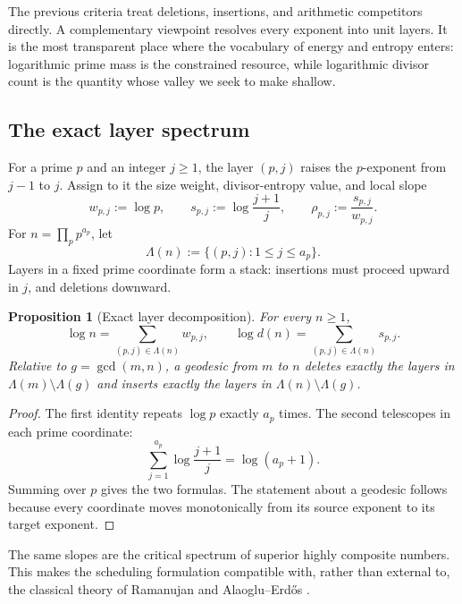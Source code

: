 \documentclass[11pt]{article}
\numberwithin{equation}{section}
\theoremstyle{blueplain}
\newtheorem{proposition}[theorem]{Proposition}
\theoremstyle{bluedef}
\begin{document}
The previous criteria treat deletions, insertions, and arithmetic competitors directly.  A complementary viewpoint resolves every exponent into unit layers.  It is the most transparent place where the vocabulary of energy and entropy enters: logarithmic prime mass is the constrained resource, while logarithmic divisor count is the quantity whose valley we seek to make shallow.

\subsection{The exact layer spectrum}

For a prime $p$ and an integer $j\ge1$, the layer $(p,j)$ raises the $p$-exponent from $j-1$ to $j$.  Assign to it the size weight, divisor-entropy value, and local slope
\begin{equation}
 w_{p,j}:=\log p,
 \qquad
 s_{p,j}:=\log\frac{j+1}{j},
 \qquad
 \rho_{p,j}:=\frac{s_{p,j}}{w_{p,j}}.
 \label{eq:layer-data}
\end{equation}
For $n=\prod_p p^{a_p}$, let
\begin{equation}
 \Lambda(n):=\{(p,j):1\le j\le a_p\}.
 \label{eq:layer-set}
\end{equation}
Layers in a fixed prime coordinate form a stack: insertions must proceed upward in $j$, and deletions downward.

\begin{proposition}[Exact layer decomposition]
\label{prop:layer-decomposition}
For every $n\ge1$,
\begin{equation}
 \boxed{
 \log n=\sum_{(p,j)\in\Lambda(n)}w_{p,j},
 \qquad
 \log d(n)=\sum_{(p,j)\in\Lambda(n)}s_{p,j}.}
 \label{eq:layer-decomposition}
\end{equation}
Relative to $g=\gcd(m,n)$, a geodesic from $m$ to $n$ deletes exactly the layers in $\Lambda(m)\setminus\Lambda(g)$ and inserts exactly the layers in $\Lambda(n)\setminus\Lambda(g)$.
\end{proposition}

\begin{proof}
The first identity repeats $\log p$ exactly $a_p$ times.  The second telescopes in each prime coordinate:
\[
 \sum_{j=1}^{a_p}\log\frac{j+1}{j}=\log(a_p+1).
\]
Summing over $p$ gives the two formulas.  The statement about a geodesic follows because every coordinate moves monotonically from its source exponent to its target exponent.
\end{proof}

The same slopes are the critical spectrum of superior highly composite numbers.  This makes the scheduling formulation compatible with, rather than external to, the classical theory of Ramanujan and Alaoglu--Erd\H{o}s \citep{Ramanujan1915,AlaogluErdos1944}.
\end{document}
